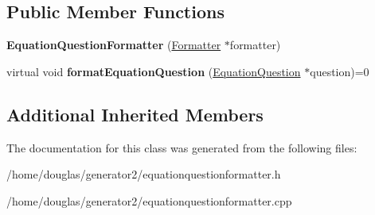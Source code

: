 \subsection*{Public Member Functions}
\begin{DoxyCompactItemize}
\item 
{\bfseries Equation\+Question\+Formatter} (\hyperlink{classFormatter}{Formatter} $\ast$formatter)\hypertarget{classEquationQuestionFormatter_a4dba4c709554a25c0cdb5831969ce1e7}{}\label{classEquationQuestionFormatter_a4dba4c709554a25c0cdb5831969ce1e7}

\item 
virtual void {\bfseries format\+Equation\+Question} (\hyperlink{classEquationQuestion}{Equation\+Question} $\ast$question)=0\hypertarget{classEquationQuestionFormatter_aca8548fb0d28dc9e41756976e392604e}{}\label{classEquationQuestionFormatter_aca8548fb0d28dc9e41756976e392604e}

\end{DoxyCompactItemize}
\subsection*{Additional Inherited Members}


The documentation for this class was generated from the following files\+:\begin{DoxyCompactItemize}
\item 
/home/douglas/generator2/equationquestionformatter.\+h\item 
/home/douglas/generator2/equationquestionformatter.\+cpp\end{DoxyCompactItemize}
